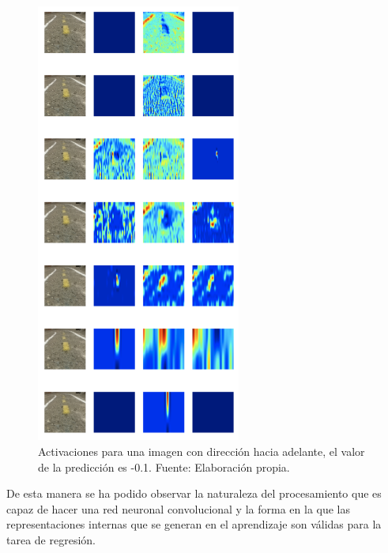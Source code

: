         \begin{figure}[!h] 
            \centering
            \includegraphics[width=0.60\textwidth]{img/predade}
            \caption[Activaciones para una imagen con dirección hacia adelante]{Activaciones para una imagen con dirección hacia adelante, el valor de 
            la predicción es -0.1. Fuente: Elaboración propia. }
            \label{fig:predade}
        \end{figure}

        De esta manera se ha podido observar la naturaleza del procesamiento que es capaz de hacer una red neuronal convolucional 
        y la forma en la que las representaciones internas que se generan en el aprendizaje son válidas para la 
        tarea de regresión.


